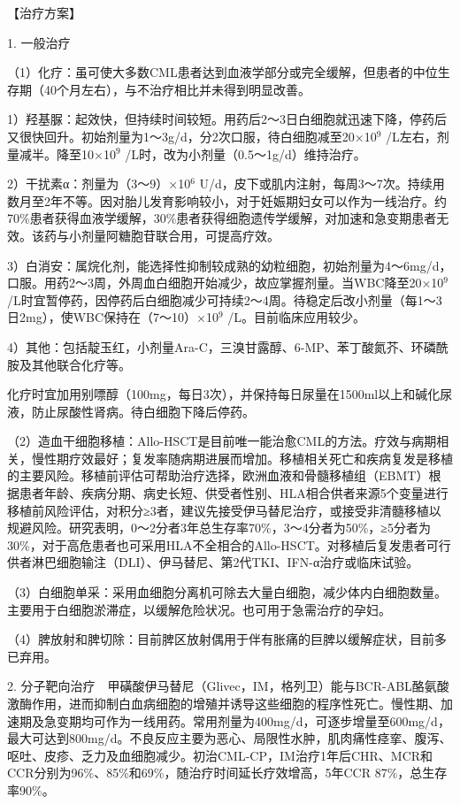 【治疗方案】

1. 一般治疗

（1）化疗：虽可使大多数CML患者达到血液学部分或完全缓解，但患者的中位生存期（40个月左右），与不治疗相比并未得到明显改善。

1）羟基脲：起效快，但持续时间较短。用药后2～3日白细胞就迅速下降，停药后又很快回升。初始剂量为1～3g/d，分2次口服，待白细胞减至20×10$^{9}$
/L左右，剂量减半。降至10×10$^{9}$
/L时，改为小剂量（0.5～1g/d）维持治疗。

2）干扰素α：剂量为（3～9）×10$^{6}$
U/d，皮下或肌内注射，每周3～7次。持续用数月至2年不等。因对胎儿发育影响较小，对于妊娠期妇女可以作为一线治疗。约70\%患者获得血液学缓解，30\%患者获得细胞遗传学缓解，对加速和急变期患者无效。该药与小剂量阿糖胞苷联合用，可提高疗效。

3）白消安：属烷化剂，能选择性抑制较成熟的幼粒细胞，初始剂量为4～6mg/d，口服。用药2～3周，外周血白细胞开始减少，故应掌握剂量。当WBC降至20×10$^{9}$
/L时宜暂停药，因停药后白细胞减少可持续2～4周。待稳定后改小剂量（每1～3日2mg），使WBC保持在（7～10）×10$^{9}$
/L。目前临床应用较少。

4）其他：包括靛玉红，小剂量Ara-C，三溴甘露醇、6-MP、苯丁酸氮芥、环磷酰胺及其他联合化疗等。

化疗时宜加用别嘌醇（100mg，每日3次），并保持每日尿量在1500ml以上和碱化尿液，防止尿酸性肾病。待白细胞下降后停药。

（2）造血干细胞移植：Allo-HSCT是目前唯一能治愈CML的方法。疗效与病期相关，慢性期疗效最好；复发率随病期进展而增加。移植相关死亡和疾病复发是移植的主要风险。移植前评估可帮助治疗选择，欧洲血液和骨髓移植组（EBMT）根据患者年龄、疾病分期、病史长短、供受者性别、HLA相合供者来源5个变量进行移植前风险评估，对积分≥3者，建议先接受伊马替尼治疗，或接受非清髓移植以规避风险。研究表明，0～2分者3年总生存率70\%，3～4分者为50\%，≥5分者为30\%，对于高危患者也可采用HLA不全相合的Allo-HSCT。对移植后复发患者可行供者淋巴细胞输注（DLI）、伊马替尼、第2代TKI、IFN-α治疗或临床试验。

（3）白细胞单采：采用血细胞分离机可除去大量白细胞，减少体内白细胞数量。主要用于白细胞淤滞症，以缓解危险状况。也可用于急需治疗的孕妇。

（4）脾放射和脾切除：目前脾区放射偶用于伴有胀痛的巨脾以缓解症状，目前多已弃用。

2.
分子靶向治疗　甲磺酸伊马替尼（Glivec，IM，格列卫）能与BCR-ABL酪氨酸激酶作用，进而抑制白血病细胞的增殖并诱导这些细胞的程序性死亡。慢性期、加速期及急变期均可作为一线用药。常用剂量为400mg/d，可逐步增量至600mg/d，最大可达到800mg/d。不良反应主要为恶心、局限性水肿，肌肉痛性痉挛、腹泻、呕吐、皮疹、乏力及血细胞减少。初治CML-CP，IM治疗1年后CHR、MCR和CCR分别为96\%、85\%和69\%，随治疗时间延长疗效增高，5年CCR
87\%，总生存率90\%。

